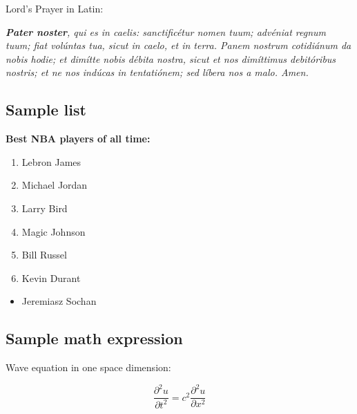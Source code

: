 \centerline{Lord's Prayer in Latin:}

\emph{\textbf{Pater noster}, qui es in caelis: sanctificétur nomen tuum; advéniat regnum tuum; fiat volúntas tua, sicut in caelo, et in terra. Panem nostrum cotidiánum da nobis hodie; et dimítte nobis débita nostra, sicut et nos dimíttimus debitóribus nostris; et ne nos indúcas in tentatiónem; sed líbera nos a malo. Amen.}

\subsection{Sample list}

\textbf{Best NBA players of all time:}

\begin{enumerate}
    \item Lebron James
    \item Michael Jordan
    \item Larry Bird
    \item Magic Johnson
    \item Bill Russel
    \item Kevin Durant
\end{enumerate}

\begin{itemize}
    \item Jeremiasz Sochan
\end{itemize}

\subsection{Sample math expression}

Wave equation in one space dimension:

\[\frac{\partial^2 u}{\partial t^2} = c^2 \frac{\partial^2 u}{\partial x^2}\]


